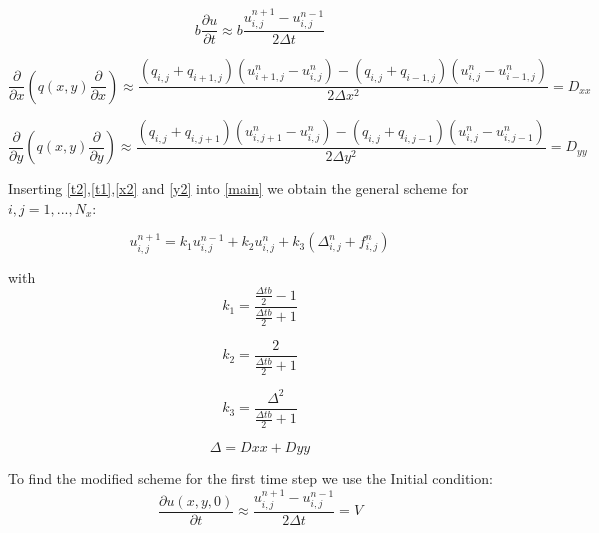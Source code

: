 \documentclass[10pt,a4paper]{report}
\begin{document}
\begin{equation}\label{t1}
b\frac{\partial u}{\partial t} \approx b\frac{ u_{i,j}^{n+1}-u_{i,j}^{n-1}}{2\Delta t} 
\end{equation} 

\begin{equation}\label{x2}
\frac{\partial}{\partial x}\left(  q(x,y)\frac{\partial}{\partial x}   \right) \approx \frac{ (q_{i,j}+q_{i+1,j})(u_{i+1,j}^{n}- u_{i,j}^{n})-(q_{i,j}+q_{i-1,j})(u_{i,j}^{n}-u_{i-1,j}^{n}) }{2\Delta x^{2}} = D_{xx}
\end{equation}

\begin{equation}\label{y2}
\frac{\partial}{\partial y}\left(  q(x,y)\frac{\partial}{\partial y}   \right) \approx \frac{ (q_{i,j}+q_{i,j+1})(u_{i,j+1}^{n}- u_{i,j}^{n})-(q_{i,j}+q_{i,j-1})(u_{i,j}^{n}-u_{i,j-1}^{n}) }{2\Delta y^{2}}=D_{yy}
\end{equation}

Inserting \ref{t2},\ref{t1},\ref{x2} and \ref{y2} into \ref{main} we obtain the general scheme for $i,j = 1,...,N_{x}$:

\begin{equation}\label{mains}
u_{i,j}^{n+1} = k_{1}u_{i,j}^{n-1}+k_{2}u_{i,j}^{n}+k_{3}(\Delta_{i,j}^{n}+f_{i,j}^{n})
\end{equation}

with 
\begin{equation}
k_{1} = \frac{ \frac{\Delta t b}{2} -1 }{\frac{\Delta t b}{2} +1 }\nonumber
\end{equation}

\begin{equation}
k_{2} = \frac{ 2}{\frac{\Delta t b}{2} +1 }\nonumber
\end{equation}

\begin{equation}
k_{3} = \frac{ \Delta^{2}}{\frac{\Delta t b}{2} +1 }\nonumber
\end{equation}

\begin{equation}
\Delta = Dxx + Dyy\nonumber
\end{equation}

To find the modified scheme for the first time step we use the Initial condition:
\begin{equation}
\frac{\partial u(x,y,0)}{\partial t} \approx \frac{ u_{i,j}^{n+1}-u_{i,j}^{n-1}}{2\Delta t}  = V \nonumber
\end{equation}
\end{document}
